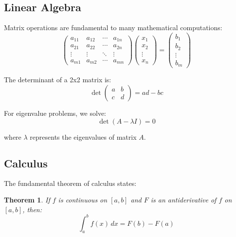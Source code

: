 \documentclass[12pt]{article}
\newtheorem{theorem}{Theorem}
\begin{document}
\subsection{Linear Algebra}

Matrix operations are fundamental to many mathematical computations:
\begin{equation}
\begin{pmatrix}
a_{11} & a_{12} & \cdots & a_{1n} \\
a_{21} & a_{22} & \cdots & a_{2n} \\
\vdots & \vdots & \ddots & \vdots \\
a_{m1} & a_{m2} & \cdots & a_{mn}
\end{pmatrix}
\begin{pmatrix}
x_1 \\ x_2 \\ \vdots \\ x_n
\end{pmatrix}
=
\begin{pmatrix}
b_1 \\ b_2 \\ \vdots \\ b_m
\end{pmatrix}
\end{equation}

The determinant of a 2x2 matrix is:
\begin{equation}
\det\begin{pmatrix} a & b \\ c & d \end{pmatrix} = ad - bc
\end{equation}

For eigenvalue problems, we solve:
\begin{equation}
\det(A - \lambda I) = 0
\end{equation}

where $\lambda$ represents the eigenvalues of matrix $A$.

\subsection{Calculus}

The fundamental theorem of calculus states:
\begin{theorem}
If $f$ is continuous on $[a,b]$ and $F$ is an antiderivative of $f$ on $[a,b]$, then:
\begin{equation}
\int_a^b f(x) \, dx = F(b) - F(a)
\end{equation}
\end{theorem}
\end{document}
